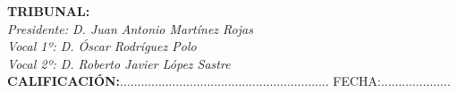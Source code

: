 \begin{flushleft}
\textbf{TRIBUNAL:}\\
\vspace{1cm}
\textit{Presidente: D. Juan Antonio Martínez Rojas}\\
\vspace{0.5cm}
\textit{Vocal 1º: D. Óscar Rodríguez Polo}\\
\vspace{0.5cm}
\textit{Vocal 2º: D. Roberto Javier López Sastre}\\
\vspace{0.5cm}
\textbf{CALIFICACIÓN:}............................................................ FECHA:.................... \\
\end{flushleft}

\newpage
\thispagestyle{empty}
\hspace*{0.5cm}
\newpage

